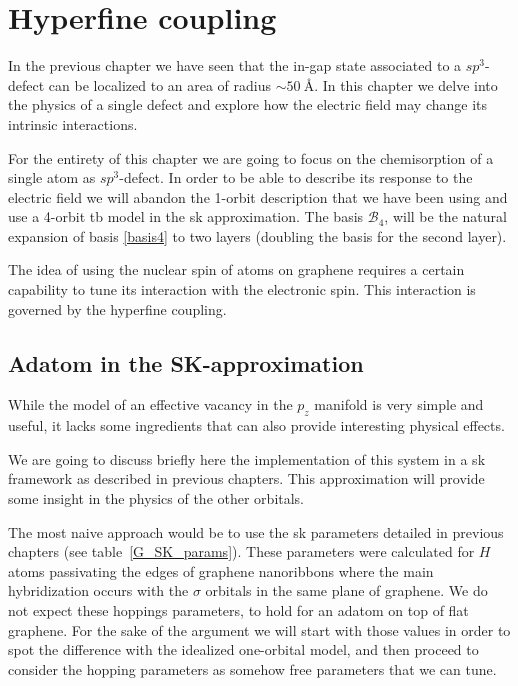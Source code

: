 \chapter{Hyperfine coupling}
\label{ch:hyperfine}
In the previous chapter we have seen that the in-gap state associated to a $sp^3$-defect can be localized to an area of radius $\sim\SI{50}{\angstrom}$. In this chapter we delve into the physics of a single defect and explore how the electric field may change its intrinsic interactions.

For the entirety of this chapter we are going to focus on the chemisorption of a single  atom as $sp^3$-defect. In order to be able to describe its response to the electric field we will abandon the 1-orbit description that we have been using and use a 4-orbit \ac{tb} model in the \ac{sk} approximation. The basis $\mathcal{B}_4$, will be the natural expansion of basis \eqref{basis4} to two layers (doubling the basis for the second layer).


The idea of using the nuclear spin of  atoms on graphene requires a certain capability to tune its interaction with the electronic spin. This interaction is governed by the hyperfine coupling.


\section{Adatom in the SK-approximation}
While the model of an effective vacancy in the $p_z$ manifold is very simple and useful, it lacks some ingredients that can also provide interesting physical effects.

We are going to discuss briefly here the implementation of this system in a \ac{sk} framework as described in previous chapters. This approximation will provide some insight in the physics of the other orbitals.


The most naive approach would be to use the \ac{sk} parameters detailed in previous chapters (see table~\ref{G_SK_params}). These parameters were calculated for $H$ atoms passivating the edges of graphene nanoribbons\cite{Gosalbez-Martinez2011} where the main hybridization occurs with the $\sigma$ orbitals in the same plane of graphene. We do not expect these hoppings parameters, to hold for an adatom on top of flat graphene. For the sake of the argument we will start with those values in order to spot the difference with the idealized one-orbital model, and then proceed to consider the hopping parameters as somehow free parameters that we can tune.


